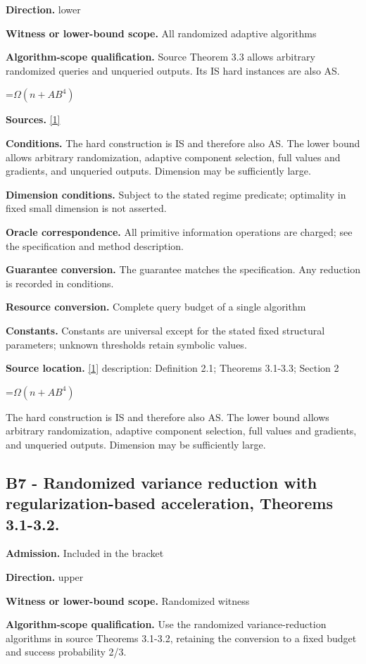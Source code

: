 \documentclass[10pt,a4paper]{article}
\newcommand{\AtlasMath}[1]{\par\begingroup\centering\setbox0=\hbox{$\displaystyle #1$}\ifdim\wd0>1.4\linewidth\typeout{ATLAS WIDE FORMULA: \the\wd0}\fi\ifdim\wd0>\linewidth\resizebox{\linewidth}{!}{\box0}\else\box0\fi\par\endgroup}
\begin{document}
\textbf{Direction.} lower

\textbf{Witness or lower-bound scope.} All randomized adaptive algorithms

\textbf{Algorithm-scope qualification.} Source Theorem 3.3 allows arbitrary randomized queries and unqueried outputs. Its IS hard instances are also AS.

\AtlasMath{\Omega(n+AB^4)}
\textbf{Sources.} \href{https://arxiv.org/pdf/2610.16991v2}{[1]}

\textbf{Conditions.} The hard construction is IS and therefore also AS. The lower bound allows arbitrary randomization, adaptive component selection, full values and gradients, and unqueried outputs. Dimension may be sufficiently large.

\textbf{Dimension conditions.} Subject to the stated regime predicate; optimality in fixed small dimension is not asserted.

\textbf{Oracle correspondence.} All primitive information operations are charged; see the specification and method description.

\textbf{Guarantee conversion.} The guarantee matches the specification. Any reduction is recorded in conditions.

\textbf{Resource conversion.} Complete query budget of a single algorithm

\textbf{Constants.} Constants are universal except for the stated fixed structural parameters; unknown thresholds retain symbolic values.

\textbf{Source location.} \href{https://arxiv.org/pdf/2610.16991v2}{[1]} description: Definition 2.1; Theorems 3.1-3.3; Section 2

\AtlasMath{\Omega(n+AB^4)}
The hard construction is IS and therefore also AS. The lower bound allows arbitrary randomization, adaptive component selection, full values and gradients, and unqueried outputs. Dimension may be sufficiently large.

\subsection{B7 - Randomized variance reduction with regularization-based acceleration, Theorems 3.1-3.2.}
\textbf{Admission.} Included in the bracket

\textbf{Direction.} upper

\textbf{Witness or lower-bound scope.} Randomized witness

\textbf{Algorithm-scope qualification.} Use the randomized variance-reduction algorithms in source Theorems 3.1-3.2, retaining the conversion to a fixed budget and success probability 2/3.
\end{document}

